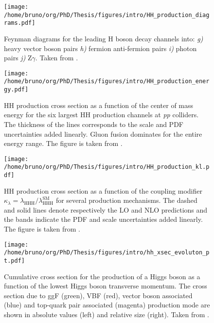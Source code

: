 \documentclass[11pt]{article}
\newcommand{\klrat}{\kappa_{\lambda} = \lambda_{\text{HHH}} / \lambda_{\text{HHH}}^{\text{SM}}}
\begin{document}
\begin{figure}[htbp]
\centering
\texttt{[image: /home/bruno/org/PhD/Thesis/figures/intro/HH\_production\_diagrams.pdf]}
\caption{\label{fig:HH_production_diagrams}Feynman diagrams for the leading H boson decay channels into: \emph{g)} heavy vector boson pairs \emph{h)} fermion anti-fermion pairs \emph{i)} photon pairs \emph{j)} Z\(\gamma\). Taken from \cite{higgs_10_years}.}
\end{figure}

\begin{figure}[htbp]
\centering
\texttt{[image: /home/bruno/org/PhD/Thesis/figures/intro/HH\_production\_energy.pdf]}
\caption{\label{fig:HH_prod_energy}HH production cross section as a function of the center of mass energy for the six largest HH production channels at \emph{pp} colliders. The thickness of the lines corresponds to the scale and PDF uncertainties added linearly. Gluon fusion dominates for the entire energy range. The figure is taken from \cite{HH_xsec_running}.}
\end{figure}

\begin{figure}[htbp]
\centering
\texttt{[image: /home/bruno/org/PhD/Thesis/figures/intro/HH\_production\_kl.pdf]}
\caption{\label{fig:HH_prod_kl}HH production cross section as a function of the coupling modifier \(\klrat\) for several production mechanisms. The dashed and solid lines denote respectively the LO and NLO predictions and the bands indicate the PDF and scale uncertainties added linearly. The figure is taken from \cite{HH_xsec_running}.}
\end{figure}

\begin{figure}[htbp]
\centering
\texttt{[image: /home/bruno/org/PhD/Thesis/figures/intro/hh\_xsec\_evoluton\_pt.pdf]}
\caption{\label{fig:HH_prod_kl}Cumulative cross section for the production of a Higgs boson as a function of the lowest Higgs boson transverse momentum. The cross section due to \ac{ggF} (green), \ac{VBF} (red), vector boson associated (blue) and top-quark pair associated (magenta) production mode are shown in absolute values (left) and relative size (right). Taken from \cite{xsec_evolution_pt}.}
\end{figure}
\end{document}
